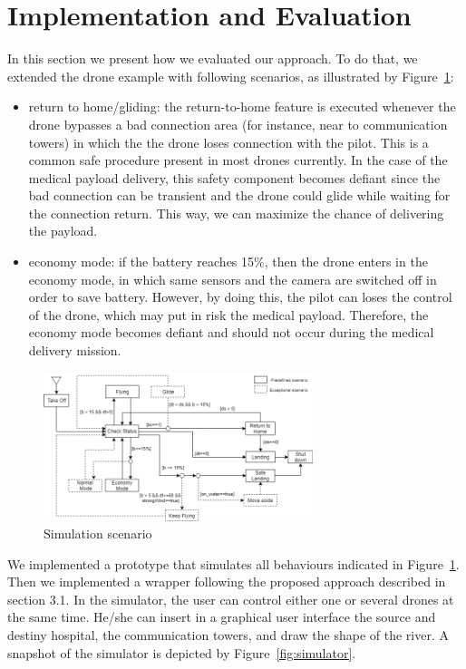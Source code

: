 \section{Implementation and Evaluation}

In this section we present how we evaluated our approach. To do that, we extended the drone example with following scenarios, as illustrated by Figure~\ref{fig:simulation-scenario}: 

\begin{itemize}
    \item return to home/gliding: the return-to-home feature is executed whenever the drone bypasses a bad connection area (for instance, near to communication towers) in which the the drone loses connection with the pilot. This is a common safe procedure present in most drones currently. In the case of the medical payload delivery, this safety component becomes defiant since the bad connection can be transient and the drone could glide while waiting for the connection return. This way, we can maximize the chance of delivering the payload.  
    \item economy mode: if the battery reaches 15\%, then the drone enters in the economy mode, in which same sensors and the camera are switched off in order to save battery. However, by doing this, the pilot can loses the control of the drone, which may put in risk the medical payload. Therefore, the economy mode becomes defiant and should not occur during the medical delivery mission. 
\end{itemize}

\begin{figure}[h]\centering
 \includegraphics[width=0.7\textwidth]{figures/simulation-scenario.png}
 \caption{Simulation scenario}
 \label{fig:simulation-scenario}
 \vspace*{-0.5cm}
\end{figure}

We implemented a prototype that simulates all behaviours indicated in Figure~\ref{fig:simulation-scenario}. Then we implemented a wrapper following the proposed approach described in section 3.1. In the simulator, the user can control either one or several drones at the same time. He/she can insert in a graphical user interface the source and destiny hospital, the communication towers, and draw the shape of the river. A snapshot of the simulator is depicted by Figure~\ref{fig:simulator}.   

